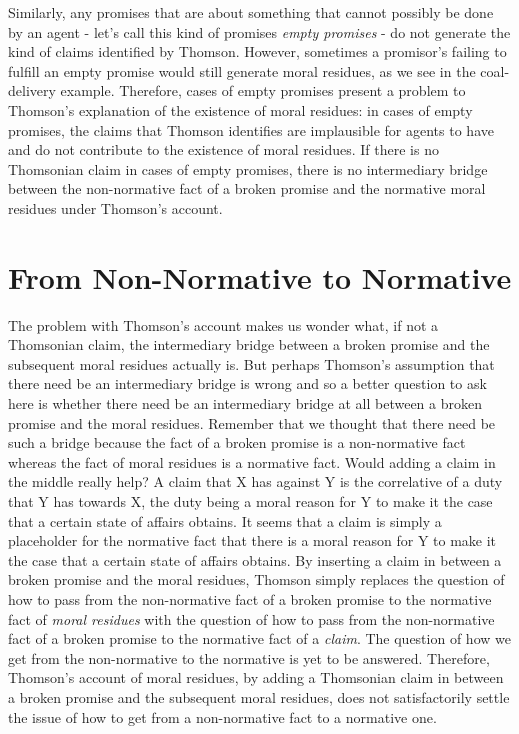 Similarly, any promises that are about something that cannot possibly be
done by an agent - let's call this kind of promises \emph{empty
promises} - do not generate the kind of claims identified by Thomson.
However, sometimes a promisor's failing to fulfill an empty promise
would still generate moral residues, as we see in the coal-delivery
example. Therefore, cases of empty promises present a problem to
Thomson's explanation of the existence of moral residues: in cases of
empty promises, the claims that Thomson identifies are implausible for
agents to have and do not contribute to the existence of moral residues.
If there is no Thomsonian claim in cases of empty promises, there is no
intermediary bridge between the non-normative fact of a broken promise
and the normative moral residues under Thomson's account.

\section{From Non-Normative to Normative}

The problem with Thomson's account makes us wonder what, if not a
Thomsonian claim, the intermediary bridge between a broken promise and
the subsequent moral residues actually is. But perhaps Thomson's
assumption that there need be an intermediary bridge is wrong and so a
better question to ask here is whether there need be an intermediary
bridge at all between a broken promise and the moral residues. Remember
that we thought that there need be such a bridge because the fact of a
broken promise is a non-normative fact whereas the fact of moral
residues is a normative fact. Would adding a claim in the middle really
help? A claim that X has against Y is the correlative of a duty that Y
has towards X, the duty being a moral reason for Y to make it the case
that a certain state of affairs obtains. It seems that a claim is simply
a placeholder for the normative fact that there is a moral reason for Y
to make it the case that a certain state of affairs obtains. By
inserting a claim in between a broken promise and the moral residues,
Thomson simply replaces the question of how to pass from the
non-normative fact of a broken promise to the normative fact of
\emph{moral residues} with the question of how to pass from the
non-normative fact of a broken promise to the normative fact of a
\emph{claim}. The question of how we get from the non-normative to the
normative is yet to be answered. Therefore, Thomson's account of moral
residues, by adding a Thomsonian claim in between a broken promise and
the subsequent moral residues, does not satisfactorily settle the issue
of how to get from a non-normative fact to a normative one.

